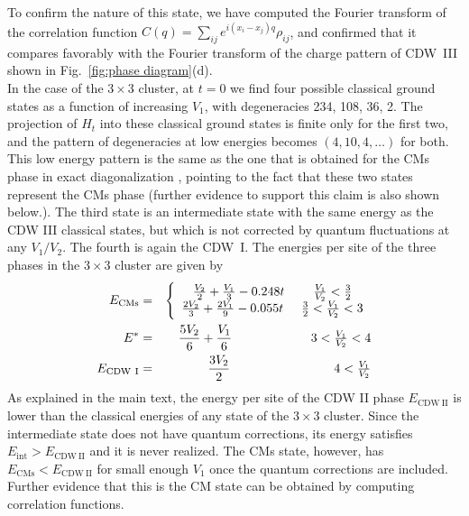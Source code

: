 \documentclass[aps,prx,10pt,twocolumn,floatfix,superscriptaddress,showpacs,numerical,footinbib]{revtex4-1}
\begin{document}
%
To confirm the nature of this state, we have computed the Fourier transform of the correlation function $C(q) = \sum_{ij} e^{i(x_i-x_j)q} \rho_{ij}$, and confirmed that it compares favorably with the Fourier transform of the charge pattern of CDW~III shown in Fig.~\ref{fig:phase diagram}(d).\\
%
In the case of the $3\times3$ cluster, at $t=0$ we find four possible classical ground states as a function of increasing $V_1$, with degeneracies 234, 108, 36, 2.
%
The projection of $H_t$ into these classical ground states is finite only for the first two, and the pattern of degeneracies at low energies becomes $(4,10,4,\ldots)$ for both.
%
This low energy pattern is the same as the one that is obtained for the CMs phase in exact diagonalization \cite{GGNVC13}, 
pointing to the fact that these two states represent the CMs phase (further evidence to support this claim is also shown below.).  
%
The third state is an intermediate state with the same energy as the CDW III classical states, but which is not corrected by quantum fluctuations at any $V_1/V_2$.  
%
The fourth is again the CDW~I. 
%
The energies per site of the three phases in the $3\times3$ cluster are given by
%
\begin{eqnarray}
E_{\mathrm{CMs}} &=& \left\{ \begin{array}{c} \frac{V_2}{2} + \frac{V_1}{3} -0.248t \hspace{8mm} \tfrac{V_1}{V_2} < \tfrac{3}{2} \\  
\frac{2V_2}{3} + \frac{2V_1}{9} -0.055t \hspace{5mm}   \tfrac{3}{2} <\tfrac{V_1}{V_2} < 3\end{array} \right. \\
E^* &=& \frac{5V_2}{6} + \frac{V_1}{6} \hspace{22mm}   3 <\tfrac{V_1}{V_2} < 4 \\
E_{\mathrm{CDW~I}} &=& \frac{3V_2}{2}   \hspace{29mm}   4 < \tfrac{V_1}{V_2} 
\end{eqnarray}
%
As explained in the main text, the energy per site of the CDW II phase $E_{\mathrm{CDW~II}}$ is lower than the classical energies of any state of the $3\times3$ cluster. 
%
Since the intermediate state does not have quantum corrections, its energy satisfies $E_{\mathrm{int}}>E_{\mathrm{CDW~II}}$ and it is never realized. 
%
The CMs state, however, has $E_{\mathrm{CMs}} < E_{\mathrm{CDW~II}}$ for small enough $V_1$ once the quantum corrections are included. 
%
Further evidence that this is the CM state can be obtained by computing correlation functions. 
\end{document}
